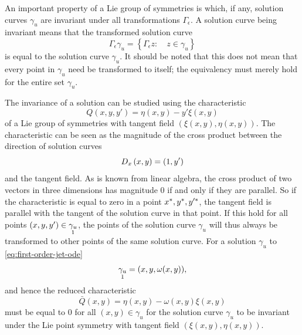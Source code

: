 An important property of a Lie group of symmetries is which, if any, solution curves \(\gamma_u\) are invariant under all transformations \(\Gamma_\epsilon\).
A solution curve being invariant means that the transformed solution curve
\begin{equation*}
  \Gamma_\epsilon \gamma_u = \left\{\Gamma_\epsilon z :\quad z \in \gamma_u\right\}
\end{equation*}
is equal to the solution curve \(\gamma_u\).
It should be noted that this does not mean that every point in \(\gamma_u\) need be transformed to itself; the equivalency must merely hold for the entire set \(\gamma_u\).

The invariance of a solution can be studied using the characteristic
\begin{equation*}
  Q(x, y, y') = \eta(x, y) - y' \xi(x, y)
\end{equation*}
of a Lie group of symmetries with tangent field \(\left(\xi(x,y), \eta(x,y)\right)\).
The characteristic can be seen as the magnitude of the cross product between the direction of solution curves
\begin{equation*}
  \tD{x} \left(x, y\right) = \left(1, y'\right)
\end{equation*}
and the tangent field.
As is known from linear algebra, the cross product of two vectors in three dimensions has magnitude 0 if and only if they are parallel.
So if the characteristic is equal to zero in a point \(x^*, y^*, y'^*\), the tangent field is parallel with the tangent of the solution curve in that point.
If this hold for all points \(\left(x, y, y'\right) \in \prolong{\gamma_u}{1}\), the points of the solution curve \(\gamma_u\) will thus always be transformed to other points of the same solution curve.
For a solution \(\gamma_u\) to \cref{eq:first-order-jet-ode}
\begin{equation*}
  \prolong{\gamma_u}{1} = \left(x, y, \omega(x, y)\right),
\end{equation*}
and hence the reduced characteristic
\begin{equation*}
  \bar{Q}(x, y) = \eta(x, y) - \omega(x, y) \xi(x, y)
\end{equation*}
must be equal to \(0\) for all \(\left(x, y\right) \in \gamma_u\) for the solution curve \(\gamma_u\) to be invariant under the Lie point symmetry with tangent field \(\left(\xi(x,y), \eta(x,y)\right)\).

